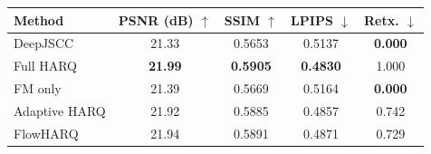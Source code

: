 \begin{tabular}{lcccc}
\toprule
Method & PSNR (dB) $\uparrow$ & SSIM $\uparrow$ & LPIPS $\downarrow$ & Retx. $\downarrow$ \\
\midrule
DeepJSCC & 21.33 & 0.5653 & 0.5137 & \textbf{0.000} \\
Full HARQ & \textbf{21.99} & \textbf{0.5905} & \textbf{0.4830} & 1.000 \\
FM only & 21.39 & 0.5669 & 0.5164 & \textbf{0.000} \\
Adaptive HARQ & 21.92 & 0.5885 & 0.4857 & 0.742 \\
FlowHARQ & 21.94 & 0.5891 & 0.4871 & 0.729 \\
\bottomrule
\end{tabular}
